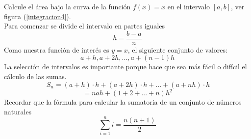 \documentclass[10pt,twoside]{SelfArx} %
\begin{document}
\begin{ejemplo}\label{calculo_area}
	Calcule el área bajo la curva de la función $ f(x)=x $ en el intervalo $ [a,b] $, ver figura (\ref{integracion4}).\\
	Para comenzar se divide el intervalo en partes iguales\\
	\[ h=\dfrac{b-a}{n} \]
Como nuestra función de interés es $ y=x $, el siguiente conjunto de valores:
	\[ a+h, a+2h, ..., a+(n-1)h \]
	La selección de intervalos es importante porque hace que sea más fácil o difícil el cálculo de las sumas. \\

	\begin{equation}\
	S_{n}=(a+h)\cdot h+(a+2h)\cdot h+...+(a+nh)\cdot h
	\end{equation}
	\begin{equation}
	=nah+(1+2+...+n)h^{2}
	\end{equation} 
	Recordar que la fórmula para calcular la sumatoria de un conjunto de números naturales 
	\[ \sum_{i=1}^{n}i=\dfrac{n(n+1)}{2} \]
	

\end{ejemplo}
\end{document}
